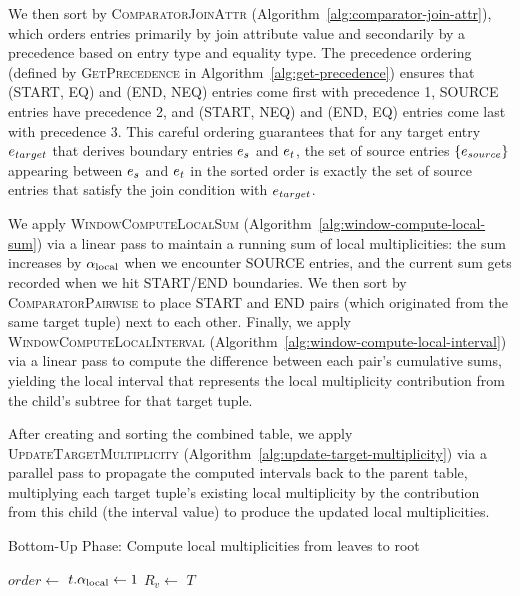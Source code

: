 We then sort by \textsc{ComparatorJoinAttr} (Algorithm~\ref{alg:comparator-join-attr}), which orders entries primarily by join attribute value and secondarily by a precedence based on entry type and equality type. The precedence ordering (defined by \textsc{GetPrecedence} in Algorithm~\ref{alg:get-precedence}) ensures that (START, EQ) and (END, NEQ) entries come first with precedence 1, SOURCE entries have precedence 2, and (START, NEQ) and (END, EQ) entries come last with precedence 3. This careful ordering guarantees that for any target entry $e_{target}$ that derives boundary entries $e_s$ and $e_t$, the set of source entries $\{e_{source}\}$ appearing between $e_s$ and $e_t$ in the sorted order is exactly the set of source entries that satisfy the join condition with $e_{target}$.

We apply \textsc{WindowComputeLocalSum} (Algorithm~\ref{alg:window-compute-local-sum}) via a linear pass to maintain a running sum of local multiplicities: the sum increases by $\alpha_{\text{local}}$ when we encounter SOURCE entries, and the current sum gets recorded when we hit START/END boundaries. We then sort by \textsc{ComparatorPairwise} to place START and END pairs (which originated from the same target tuple) next to each other. Finally, we apply \textsc{WindowComputeLocalInterval} (Algorithm~\ref{alg:window-compute-local-interval}) via a linear pass to compute the difference between each pair's cumulative sums, yielding the local interval that represents the local multiplicity contribution from the child's subtree for that target tuple.

After creating and sorting the combined table, we apply \textsc{UpdateTargetMultiplicity} (Algorithm~\ref{alg:update-target-multiplicity}) via a parallel pass to propagate the computed intervals back to the parent table, multiplying each target tuple's existing local multiplicity by the contribution from this child (the interval value) to produce the updated local multiplicities.

\begin{algorithm}[H]
\caption{Bottom-Up Phase: Compute local multiplicities from leaves to root}
\label{alg:bottom-up}
\begin{algorithmic}[1]
    \State $order \leftarrow$ 
                \State $t.\alpha_{\text{local}} \leftarrow 1$
            \EndFor
        \Else
                \State $R_v \leftarrow$ 
            \EndFor
        \EndIf
    \EndFor
    \State \Return $T$\EndFunction
\end{algorithmic}
\end{algorithm}

